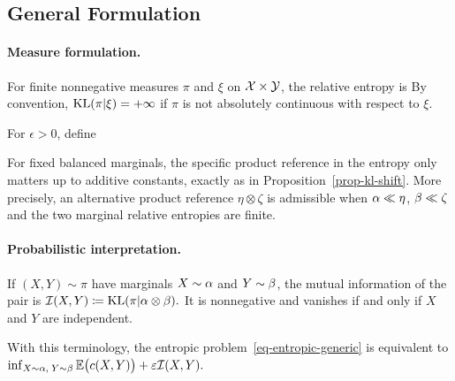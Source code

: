 \subsection{General Formulation}
\paragraph{Measure formulation.}
\begin{defn}\label{def-measure-relative-entropy}
For finite nonnegative measures $\pi$ and $\xi$ on $\mathcal{X}\times\mathcal{Y}$, the relative entropy is
By convention, $\operatorname{KL}(\pi|\xi)=+\infty$ if $\pi$ is not absolutely continuous with respect to $\xi$.
\end{defn}
\begin{defn}\label{def-continuous-entropic-ot}
For $\epsilon>0$, define
\end{defn}
For fixed balanced marginals, the specific product reference in the entropy only matters up to additive constants, exactly as in Proposition~\ref{prop-kl-shift}. More precisely, an alternative product reference $\eta\otimes\zeta$ is admissible when $\alpha\ll\eta$, $\beta\ll\zeta$ and the two marginal relative entropies are finite.

\paragraph{Probabilistic interpretation.}
\begin{defn}\label{def-mutual-information}
If $(X,Y)\sim\pi$ have marginals $X\sim\alpha$ and $Y\sim\beta$, the mutual information of the pair is \(\mathcal{I}(X,Y)\coloneqq \operatorname{KL}(\pi|\alpha\otimes\beta).\)
It is nonnegative and vanishes if and only if $X$ and $Y$ are independent.
\end{defn}
With this terminology, the entropic problem~\eqref{eq-entropic-generic} is equivalent to
\(\inf_{X\sim\alpha,\;Y\sim\beta} \mathbb{E}\bigl(c(X,Y)\bigr)+\varepsilon\mathcal{I}(X,Y).\)
